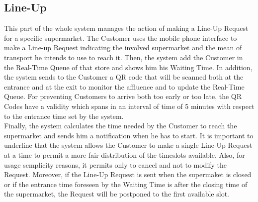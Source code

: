 \subsection{Line-Up}

This part of the whole system manages the action of making a Line-Up Request for a specific supermarket. The Customer uses the mobile phone interface to make a Line-up Request indicating the involved supermarket and the mean of transport he intends to use to reach it. Then, the system add the Customer in the Real-Time Queue of that store and shows him his Waiting Time. In addition, the system sends to the Customer a QR code that will be scanned both at the entrance and at the exit to monitor the affluence and to update the Real-Time Queue. For preventing Customers to arrive both too early or too late, the QR Codes have a validity which spans in an interval of time of 5 minutes with respect to the entrance time set by the system. \\
Finally, the system calculates the time needed by the Customer to reach the supermarket and sends him a notification when he has to start.
It is important to underline that the system allows the Customer to make a single Line-Up Request at a time to permit a more fair distribution of the timeslots available. Also, for usage semplicity reasons, it permits only to cancel and not to modify the Request. Moreover, if the Line-Up Request is sent when the supermaket is closed or if the entrance time foreseen by the Waiting Time is after the closing time of the supermarket, the Request will be postponed to the first available slot. 
